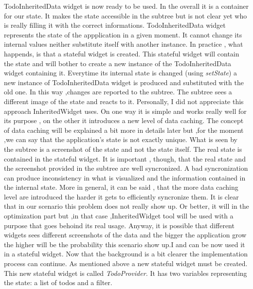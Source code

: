 TodoInheritedData widget is now ready to be used. In the overall it is a container for our state. It makes the state accessible in the subtree but is not clear yet who is really filling it with the correct informations. TodoInheritedData widget represents the state of the appplication in a given moment. It cannot change its internal values neither substitute itself with another instance. In practice , what happends, is that a stateful widget is created. This stateful widget will contain the state and will bother to create a new instance of the TodoInheritedData widget containing it. Everytime its internal state is changed (using \textit{setState}) a new instance of TodoInheritedData widget is produced and substituted with the old one. In this way ,changes are reported to the subtree. The subtree sees a different image of the state and reacts to it. Personally, I did not appreciate this approach InheritedWidget uses. On one way it is simple and works really well for its purpose , on the other it introduces a new level of data caching. The concept of data caching will be explained a bit more in details later but ,for the moment ,we can say that the application's state is not exactly unique. What is seen by the subtree is a screenshot of the state and not the state itself. The real state is contained in the stateful widget. It is important , though, that the real state and the screenshot provided in the subtree are well syncronized. A bad syncronization can produce inconsistency in what is visualized and the information contained in the internal state. More in general, it can be said , that the more data caching level are introduced the harder it gets to efficiently syncronize them. It is clear that in our scenario this problem does not really show up. Or better, it will in the optimization part but ,in that case ,InheritedWidget tool will be used with a purpose that goes behoind its real usage. Anyway, it is possible that different widgets sees different screenshots of the data and the bigger the application grow the higher will be the probability this scenario show up.I and can be now used it in a stateful widget. Now that the background is a bit clearer the implementation process can continue. As mentioned above a new stateful widget must be created. This new stateful widget is called \textit{TodoProvider.} It has two variables representing the state: a list of todos and a filter.
\mbox{}\\

 \mbox{}

